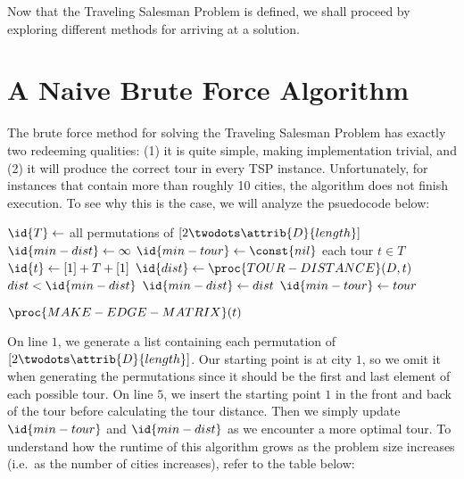 \documentclass{article}
\begin{document}
Now that the Traveling Salesman Problem is defined, we shall proceed by
exploring different methods for arriving at a solution.

\section*{A Naive Brute Force Algorithm}
The brute force method for solving the Traveling Salesman Problem has exactly 
two redeeming qualities: (1) it is quite simple, making implementation
trivial, and (2) it will produce the correct tour in every TSP instance.
Unfortunately, for instances that contain more than roughly 10 cities, the
algorithm does not finish execution.  To see why this is the case, we will
analyze the psuedocode below:
\par
\vspace{0.5cm}


\begin{codebox}
\li $\id{T} \gets$ all permutations of $[2 \twodots \attrib{D}{length}]$
\li $\id{min-dist} \gets \infty$
\li $\id{min-tour} \gets \const{nil}$
\li \For each tour $t \in T$
\li   \Do 
	$\id{t} \gets [1] + T + [1]$
\li       $\id{dist} \gets \proc{TOUR-DISTANCE}(D, t)$
\li	  \If $dist < \id{min-dist}$
\li	    \Then
              $\id{min-dist} \gets dist$
\li	      $\id{min-tour} \gets tour$
	    \End
       \End

\li   \Return $\proc{MAKE-EDGE-MATRIX}(t)$
\end{codebox}
\vspace{0.5cm}

On line $1$, we generate a list containing each permutation of
$[2 \twodots \attrib{D}{length}]$.  Our starting point is at city
$1$, so we omit it when generating the permutations since it should
be the first and last element of each possible tour.  On line $5$, 
we insert the starting point $1$ in the front and back of the tour
before calculating the tour distance.  Then we simply update $\id{min-tour}$
and $\id{min-dist}$ as we encounter a more optimal tour.  To understand
how the runtime of this algorithm grows as the problem size increases
(i.e.\ as the number of cities increases), refer to the table below:
\par
\vspace{0.25cm}
\end{document}

